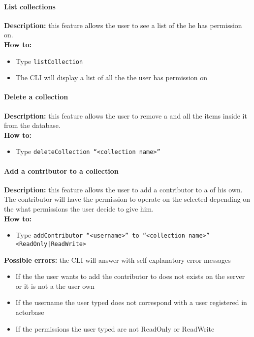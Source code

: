\documentclass{scalatekids-article}
\begin{document}
\paragraph{List collections}
\label{sec:listcollection}
\textbf{Description:} this feature allows the user to see a list of
the  he has permission on.\\
\textbf{How to:}
\begin{itemize}
\item Type \texttt{listCollection}
\item The CLI will display a list of all the  the user has
  permission on
\end{itemize}

\paragraph{Delete a collection}
\label{sec:deletecollection}
\textbf{Description:} this feature allows the user to remove a  and all the items inside it from the database.\\
\textbf{How to:}
\begin{itemize}
\item Type \texttt{deleteCollection ``<collection name>''}
\end{itemize}

\paragraph{Add a contributor to a collection}
\label{sec:addcontributor}
\textbf{Description:} this feature allows the user to add a contributor
to a  of his own. The contributor will have the permission to operate on the selected  depending on the what permissions the user decide to give him.\\
\textbf{How to:}
\begin{itemize}
\item Type \texttt{addContributor ``<username>'' to ``<collection name>'' <ReadOnly|ReadWrite>}
\end{itemize}
\textbf{Possible errors:} the CLI will answer with self explanatory error messages
\begin{itemize}
\item If the  the user wants to add the contributor to does not exists on the server or it is not a  the user own
\item If the username the user typed does not correspond with a user registered in actorbase
\item If the permissions the user typed are not ReadOnly or ReadWrite
\end{itemize}
\end{document}
